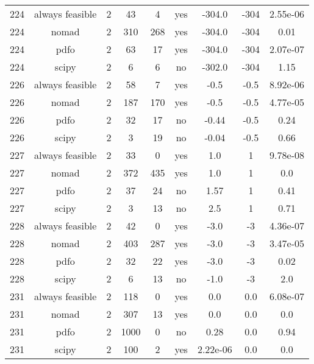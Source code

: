 \begin{scriptsize}
\begin{center}
\begin{longtable}{ccccccccc}
224 & always feasible &  2 &     43 &      4 &     yes &      -304.0 &        -304 & 2.55e-06\\
224 &           nomad &  2 &    310 &    268 &     yes &      -304.0 &        -304 &     0.01\\
224 &            pdfo &  2 &     63 &     17 &     yes &      -304.0 &        -304 & 2.07e-07\\
224 &           scipy &  2 &      6 &      6 &      no &      -302.0 &        -304 &     1.15\\
226 & always feasible &  2 &     58 &      7 &     yes &        -0.5 &        -0.5 & 8.92e-06\\
226 &           nomad &  2 &    187 &    170 &     yes &        -0.5 &        -0.5 & 4.77e-05\\
226 &            pdfo &  2 &     32 &     17 &      no &       -0.44 &        -0.5 &     0.24\\
226 &           scipy &  2 &      3 &     19 &      no &       -0.04 &        -0.5 &     0.66\\
227 & always feasible &  2 &     33 &      0 &     yes &         1.0 &           1 & 9.78e-08\\
227 &           nomad &  2 &    372 &    435 &     yes &         1.0 &           1 &      0.0\\
227 &            pdfo &  2 &     37 &     24 &      no &        1.57 &           1 &     0.41\\
227 &           scipy &  2 &      3 &     13 &      no &         2.5 &           1 &     0.71\\
228 & always feasible &  2 &     42 &      0 &     yes &        -3.0 &          -3 & 4.36e-07\\
228 &           nomad &  2 &    403 &    287 &     yes &        -3.0 &          -3 & 3.47e-05\\
228 &            pdfo &  2 &     32 &     22 &     yes &        -3.0 &          -3 &     0.02\\
228 &           scipy &  2 &      6 &     13 &      no &        -1.0 &          -3 &      2.0\\
231 & always feasible &  2 &    118 &      0 &     yes &         0.0 &         0.0 & 6.08e-07\\
231 &           nomad &  2 &    307 &     13 &     yes &         0.0 &         0.0 &      0.0\\
231 &            pdfo &  2 &   1000 &      0 &      no &        0.28 &         0.0 &     0.94\\
231 &           scipy &  2 &    100 &      2 &     yes &    2.22e-06 &         0.0 &      0.0\\

\end{longtable}
\end{center}
\end{scriptsize}
